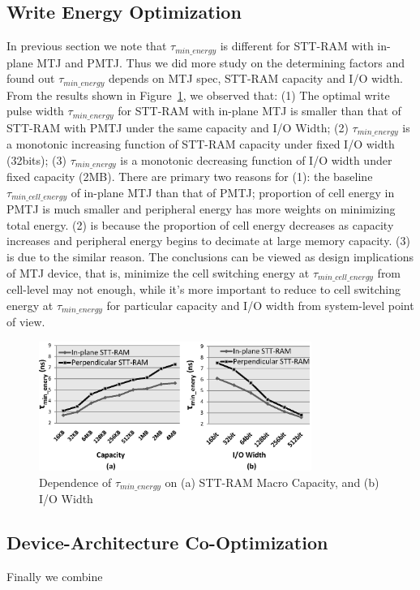 \subsection{Write Energy Optimization}
In previous section we note that $\tau_{min\_energy}$ is different for STT-RAM with in-plane MTJ and PMTJ. Thus we did more study on the determining factors and found out $\tau_{min\_energy}$ depends on MTJ spec, STT-RAM capacity and I/O width. From the results shown in Figure~\ref{fig:minenergy}, we observed that: (1) The optimal write pulse width $\tau_{min\_energy}$ for STT-RAM with in-plane MTJ is smaller than that of STT-RAM with PMTJ under the same capacity and I/O Width; (2) $\tau_{min\_energy}$ is a monotonic increasing function of STT-RAM capacity under fixed I/O width (32bits); (3) $\tau_{min\_energy}$ is a monotonic decreasing function of I/O width under fixed capacity (2MB). There are primary two reasons for (1): the baseline $\tau_{min\_cell\_energy}$ of in-plane MTJ than that of PMTJ; proportion of cell energy in PMTJ is much smaller and peripheral energy has more weights on minimizing total energy. (2) is because the proportion of cell energy decreases as capacity increases and peripheral energy begins to decimate at large memory capacity. (3) is due to the similar reason. The conclusions can be viewed as design implications of MTJ device, that is, minimize the cell switching energy at $\tau_{min\_cell\_energy}$ from cell-level may not enough, while it's more important to reduce to cell switching energy at $\tau_{min\_energy}$ for particular capacity and I/O width from system-level point of view.

\begin{figure}[t]
  \centering
  \includegraphics[width=3.5in]{fig/MinEnergy.eps}
  \caption{Dependence of $\tau_{min\_energy}$ on (a) STT-RAM Macro Capacity, and (b) I/O Width}
  \label{fig:minenergy}
\end{figure}

\subsection{Device-Architecture Co-Optimization}
Finally we combine 

